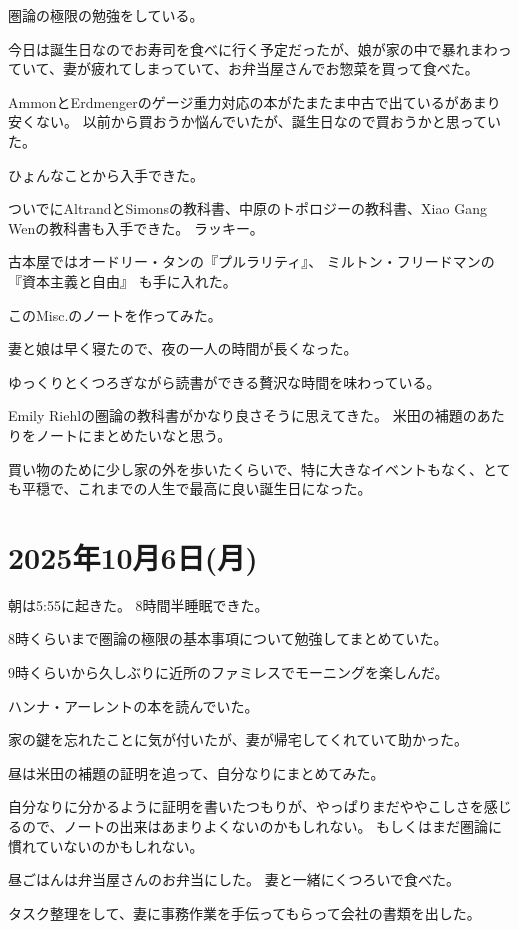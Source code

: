 \documentclass[uplatex]{jsarticle}
\begin{document}
圏論の極限の勉強をしている。

今日は誕生日なのでお寿司を食べに行く予定だったが、娘が家の中で暴れまわっていて、妻が疲れてしまっていて、お弁当屋さんでお惣菜を買って食べた。

AmmonとErdmengerのゲージ重力対応の本がたまたま中古で出ているがあまり安くない。
以前から買おうか悩んでいたが、誕生日なので買おうかと思っていた。

ひょんなことから入手できた。

ついでにAltrandとSimonsの教科書、中原のトポロジーの教科書、Xiao Gang Wenの教科書も入手できた。
ラッキー。

古本屋ではオードリー・タンの『プルラリティ』、
ミルトン・フリードマンの『資本主義と自由』
も手に入れた。

このMisc.のノートを作ってみた。

妻と娘は早く寝たので、夜の一人の時間が長くなった。

ゆっくりとくつろぎながら読書ができる贅沢な時間を味わっている。

Emily Riehlの圏論の教科書がかなり良さそうに思えてきた。
米田の補題のあたりをノートにまとめたいなと思う。

買い物のために少し家の外を歩いたくらいで、特に大きなイベントもなく、とても平穏で、これまでの人生で最高に良い誕生日になった。

\section{2025年10月6日(月)}

朝は5:55に起きた。
8時間半睡眠できた。

8時くらいまで圏論の極限の基本事項について勉強してまとめていた。

9時くらいから久しぶりに近所のファミレスでモーニングを楽しんだ。

ハンナ・アーレントの本を読んでいた。

家の鍵を忘れたことに気が付いたが、妻が帰宅してくれていて助かった。

昼は米田の補題の証明を追って、自分なりにまとめてみた。

自分なりに分かるように証明を書いたつもりが、やっぱりまだややこしさを感じるので、ノートの出来はあまりよくないのかもしれない。
もしくはまだ圏論に慣れていないのかもしれない。

昼ごはんは弁当屋さんのお弁当にした。
妻と一緒にくつろいで食べた。

タスク整理をして、妻に事務作業を手伝ってもらって会社の書類を出した。
\end{document}
